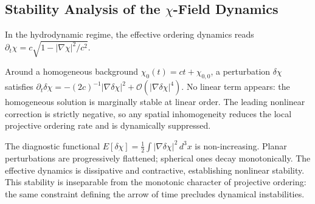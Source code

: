 \subsection{Stability Analysis of the
\texorpdfstring{$\chi$}{χ}-Field Dynamics}
  \label{subsec:stability-analysis}

  In the hydrodynamic regime, the effective ordering dynamics reads
  $\partial_t\chi
  = c\sqrt{1 - |\nabla\chi|^2/c^2}$.

  Around a homogeneous background $\chi_0(t) = ct + \chi_{0,0}$, a
  perturbation $\delta\chi$ satisfies
  $\partial_t\delta\chi
  = -(2c)^{-1}|\nabla\delta\chi|^2
  + \mathcal{O}(|\nabla\delta\chi|^4)$.
  No linear term appears: the homogeneous solution is marginally stable
  at linear order.
  The leading nonlinear correction is strictly negative, so any spatial
  inhomogeneity reduces the local projective ordering rate and is dynamically
  suppressed.

  The diagnostic functional
  $E[\delta\chi]
  = \tfrac{1}{2}\int|\nabla\delta\chi|^2\,d^3x$
  is non-increasing.
  Planar perturbations are progressively flattened; spherical ones decay
  monotonically.
  The effective dynamics is dissipative and contractive, establishing
  nonlinear stability.
  This stability is inseparable from the monotonic character of projective
  ordering: the same constraint defining the arrow of time precludes
  dynamical instabilities.
